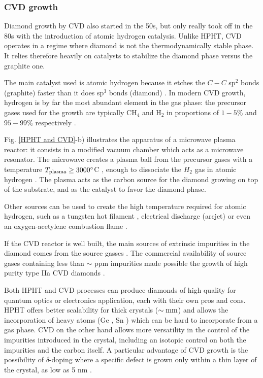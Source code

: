 \documentclass[a4paper, 11pt]{report}
\begin{document}
\subsubsection{CVD growth}
\label{fab HPHT}

Diamond growth by CVD also started in the 50s, but only really took off in the 80s \citep{matsumoto1982growth, matsumoto1982vapor, kamo1983diamond} with the introduction of atomic hydrogen catalysis. Unlike HPHT, CVD operates in a regime where diamond is not the thermodynamically stable phase. It relies therefore heavily on catalysts to stabilize the diamond phase versus the graphite one. 

The main catalyst used is atomic hydrogen because it etches the $C-C$ sp$^2$ bonds (graphite) faster than it does sp$^3$ bonds (diamond) \citep{gracio2010diamond}. In modern CVD growth, hydrogen is by far the most abundant element in the gas phase: the precursor gases used for the growth are typically CH$_4$ and H$_2$ in proportions of $1-5\%$ and $95-99\%$ respectively \citep{achard2020chemical}.

Fig. \ref{HPHT and CVD}-b) illustrates the apparatus of a microwave plasma reactor: it consists in a modified vacuum chamber which acts as a microwave resonator. The microwave creates a plasma ball from the precursor gases with a temperature $T_{\rm plasma} \geq 3000 ^\circ$C \citep{ashfold2020nitrogen}, enough to dissociate the $H_2$ gas in atomic hydrogen \citep{balmer2009chemical}. The plasma acts as the carbon source for the diamond growing on top of the substrate, and as the catalyst to favor the diamond phase. %

Other sources can be used to create the high temperature required for atomic hydrogen, such as a tungsten hot filament \citep{haubner1993diamond}, electrical discharge (arcjet) \citep{luque1998excited} or even an oxygen-acetylene combustion flame \citep{bachmann1991towards}.

If the CVD reactor is well built, the main sources of extrinsic impurities in the diamond comes from the source gasses \citep{balmer2009chemical}. The commercial availability of source gases containing less than $\sim$ ppm impurities made possible the growth of high purity type IIa CVD diamonds \citep{kasu2003high, twitchen2004high, tallaire2006characterisation}.

\medskip
Both HPHT and CVD processes can produce diamonds of high quality for quantum optics or electronics application, each with their own pros and cons. HPHT offers better scalability for thick crystals ($\sim \rm mm$) and allows the incorporation of heavy atoms (Ge \citep{palyanov2015germanium} , Sn \citep{ekimov2019effect}) which can be hard to incorporate from a gas phase. CVD on the other hand allows more versatility in the control of the impurities introduced in the crystal, including an isotopic control on both the impurities and the carbon itself. A particular advantage of CVD growth is the possibility of $\delta$-doping where a specific defect is grown only within a thin layer of the crystal, as low as 5 nm \citep{ohno2012engineering, ishikawa2012optical, ohashi2013negatively}.
\end{document}
